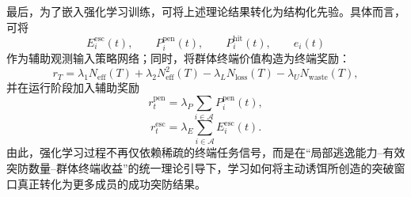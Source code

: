 最后，为了嵌入强化学习训练，可将上述理论结果转化为结构化先验。具体而言，可将
\begin{equation}
E_i^{\mathrm{esc}}(t),\qquad
P_i^{\mathrm{pen}}(t),\qquad
P_i^{\mathrm{hit}}(t),\qquad
e_i(t)
\end{equation}
作为辅助观测输入策略网络；同时，将群体终端价值构造为终端奖励：
\begin{equation}
r_T
=
\lambda_1 N_{\mathrm{eff}}(T)
+
\lambda_2 N_{\mathrm{eff}}^2(T)
-
\lambda_L N_{\mathrm{loss}}(T)
-
\lambda_U N_{\mathrm{waste}}(T),
\end{equation}
并在运行阶段加入辅助奖励
\begin{equation}
r_t^{\mathrm{pen}}
=
\lambda_P\sum_{i\in\mathcal{A}} P_i^{\mathrm{pen}}(t),
\end{equation}
\begin{equation}
r_t^{\mathrm{esc}}
=
\lambda_E\sum_{i\in\mathcal{A}} E_i^{\mathrm{esc}}(t).
\end{equation}
由此，强化学习过程不再仅依赖稀疏的终端任务信号，而是在“局部逃逸能力--有效突防数量--群体终端收益”的统一理论引导下，学习如何将主动诱饵所创造的突破窗口真正转化为更多成员的成功突防结果。
